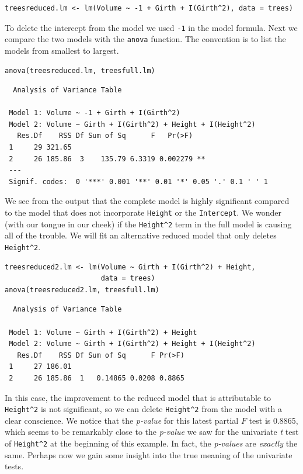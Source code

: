 \documentclass[captions=tableheading]{scrbook}
\begin{document}
\begin{example}
\begin{verbatim}
treesreduced.lm <- lm(Volume ~ -1 + Girth + I(Girth^2), data = trees)
\end{verbatim}

To delete the intercept from the model we used \texttt{-1} in the model formula. Next we compare the two models with the \texttt{anova} function. The convention is to list the models from smallest to largest.


\begin{verbatim}
anova(treesreduced.lm, treesfull.lm)
\end{verbatim}

\begin{verbatim}
  Analysis of Variance Table
 
 Model 1: Volume ~ -1 + Girth + I(Girth^2)
 Model 2: Volume ~ Girth + I(Girth^2) + Height + I(Height^2)
   Res.Df    RSS Df Sum of Sq      F   Pr(>F)   
 1     29 321.65                                
 2     26 185.86  3    135.79 6.3319 0.002279 **
 ---
 Signif. codes:  0 '***' 0.001 '**' 0.01 '*' 0.05 '.' 0.1 ' ' 1
\end{verbatim}

We see from the output that the complete model is highly significant compared to the model that does not incorporate \texttt{Height} or the \texttt{Intercept}. We wonder (with our tongue in our cheek) if the \texttt{Height\textasciicircum{}2} term in the full model is causing all of the trouble. We will fit an alternative reduced model that only deletes \texttt{Height\textasciicircum{}2}. 


\begin{verbatim}
treesreduced2.lm <- lm(Volume ~ Girth + I(Girth^2) + Height, 
                       data = trees)
anova(treesreduced2.lm, treesfull.lm)
\end{verbatim}

\begin{verbatim}
  Analysis of Variance Table
 
 Model 1: Volume ~ Girth + I(Girth^2) + Height
 Model 2: Volume ~ Girth + I(Girth^2) + Height + I(Height^2)
   Res.Df    RSS Df Sum of Sq      F Pr(>F)
 1     27 186.01                           
 2     26 185.86  1   0.14865 0.0208 0.8865
\end{verbatim}

In this case, the improvement to the reduced model that is attributable to \texttt{Height\textasciicircum{}2} is not significant, so we can delete \texttt{Height\textasciicircum{}2} from the model with a clear conscience. We notice that the \emph{p-value} for this latest partial \(F\) test is 0.8865, which seems to be remarkably close to the \emph{p-value} we saw for the univariate \emph{t} test of \texttt{Height\textasciicircum{}2} at the beginning of this example. In fact, the \emph{p-values} are \emph{exactly} the same. Perhaps now we gain some insight into the true meaning of the univariate tests.

\end{example}
\end{document}
